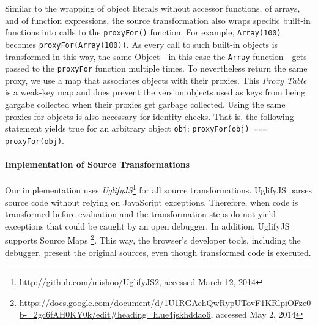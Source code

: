 Similar to the wrapping of object literals without accessor functions, of arrays, and of function expressions, the source transformation also wraps specific built-in functions into calls to the \lstinline{proxyFor()} function.
For example, \lstinline{Array(100)} becomes \lstinline{proxyFor(Array(100))}.
As every call to such built-in objects is transformed in this way, the same Object---in this case the \lstinline{Array} function---gets passed to the \lstinline{proxyFor} function multiple times.
To nevertheless return the same proxy, we use a map that associates objects with their proxies.
This \emph{Proxy Table} is a weak-key map and does prevent the version objects used as keys from being gargabe collected when their proxies get garbage collected.
Using the same proxies for objects is also necessary for identity checks.
That is, the following statement yields true for an arbitrary object \lstinline{obj}: \lstinline{proxyFor(obj) === proxyFor(obj)}.



\paragraph{Implementation of Source Transformations}
Our implementation uses \emph{UglifyJS}\footnote{\url{http://github.com/mishoo/UglifyJS2}, accessed March 12, 2014} for all source transformations.
UglifyJS parses source code without relying on JavaScript exceptions.
Therefore, when code is transformed before evaluation and the transformation steps do not yield exceptions that could be caught by an open debugger.
In addition, UglifyJS supports Source Maps \footnote{\url{https://docs.google.com/document/d/1U1RGAehQwRypUTovF1KRlpiOFze0b-_2gc6fAH0KY0k/edit\#heading=h.ue4jskhddao6}, accessed May 2, 2014}.
This way, the browser's developer tools, including the debugger, present the original sources, even though transformed code is executed.


